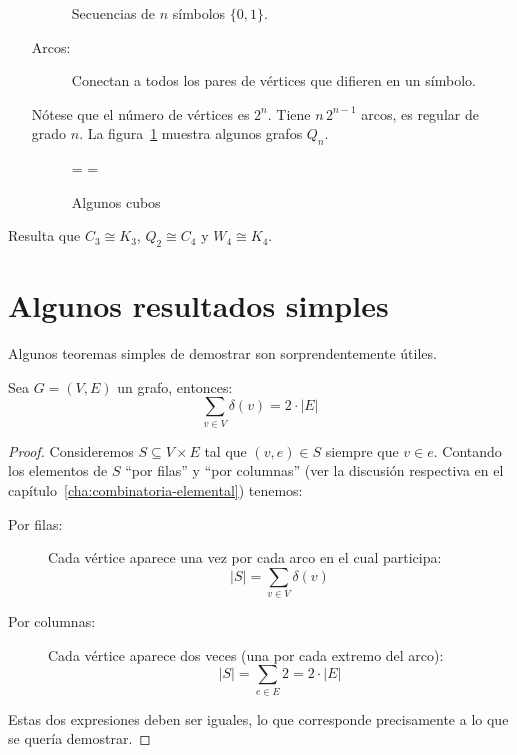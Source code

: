\begin{itemize}
\begin{center}
\begin{description}
	  Secuencias de \(n\) símbolos \(\{0, 1\}\).
	\item[Arcos:]
	  Conectan a todos los pares de vértices
	  que difieren en un símbolo.
      \end{description}
    \end{center}
    Nótese que el número de vértices
    es \(2^n\).
    Tiene \(n \, 2^{n - 1}\) arcos,
    es regular de grado \(n\).
    La figura~\ref{fig:Qn} muestra algunos grafos \(Q_n\).
    \begin{figure}[htbp]
      =\hbox{}
      =\hbox{}
      \centering
      \subfloat[\(Q_2\)]{
	\raisebox{0.5\ht3-0.5\ht2}{\copy2}
      }%
      \hspace{5em}%
      \caption{Algunos cubos}
      \label{fig:Qn}
    \end{figure}
  \end{itemize}
  Resulta que \(C_3 \cong K_3\),
  \(Q_2 \cong C_4\)
  y  \(W_4 \cong K_4\).

\section{Algunos resultados simples}
\label{sec:resultados-simples}

  Algunos teoremas simples de demostrar son sorprendentemente útiles.
  \begin{theorem}
    \label{theo:sum-degree=2edges}
    Sea \(G = (V, E)\) un grafo,
    entonces:
    \begin{equation*}
      \sum_{v \in V} \delta(v) = 2 \cdot \lvert E \rvert
    \end{equation*}
  \end{theorem}
  \begin{proof}
    Consideremos \(S \subseteq V \times E\)
    tal que \((v, e) \in S\) siempre que \(v \in e\).
    Contando los elementos de \(S\) ``por filas'' y ``por columnas''
    (ver la discusión respectiva
     en el capítulo~\ref{cha:combinatoria-elemental})
    tenemos:
    \begin{description}
    \item[Por filas:]
      Cada vértice aparece una vez
      por cada arco en el cual participa:
      \begin{equation*}
	\lvert S \rvert = \sum_{v \in V} \delta(v)
      \end{equation*}
    \item[Por columnas:]
      Cada vértice aparece dos veces
      (una por cada extremo del arco):
      \begin{equation*}
	\lvert S \rvert
	  = \sum_{e \in E} 2 = 2 \cdot \lvert E \rvert
      \end{equation*}
    \end{description}
    Estas dos expresiones deben ser iguales,
    lo que corresponde precisamente a lo que se quería demostrar.
  \end{proof}

